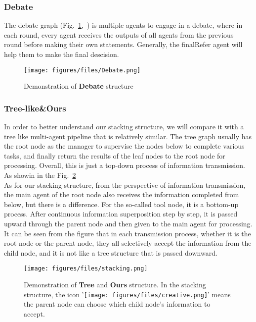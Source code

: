 \subsubsection{Debate}
The debate graph (Fig.~\ref{fig:Debate},~\cite{du2023improvingfactualityreasoninglanguage}) is multiple agents to engage in a debate, where in each round, every agent receives the outputs of all agents from the previous round before making their own statements. Generally, the finalRefer agent will help them to make the final descision.
\begin{figure}[!h] 
    \centering
    \texttt{[image: figures/files/Debate.png]}
    \caption{
    Demonstration of \textbf{Debate} structure}
    \label{fig:Debate}
\end{figure}

\subsubsection{Tree-like\&Ours}
In order to better understand our stacking structure, we will compare it with a tree like multi-agent pipeline that is relatively similar. The tree graph usually has the root node as the manager to supervise the nodes below to complete various tasks, and finally return the results of the leaf nodes to the root node for processing. Overall, this is just a top-down process of information transmission. As showin in the Fig.~\ref{fig:Stacking}\\
As for our stacking structure, from the perspective of information transmission, the main agent of the root node also receives the information completed from below, but there is a difference. For the so-called tool node, it is a bottom-up process. After continuous information superposition step by step, it is passed upward through the parent node and then given to the main agent for processing. It can be seen from the figure that in each transmission process, whether it is the root node or the parent node, they all selectively accept the information from the child node, and it is not like a tree structure that is passed downward.

\begin{figure}[!h] 
    \centering
    \texttt{[image: figures/files/stacking.png]}
    \caption{
    Demonstration of \textbf{Tree} and \textbf{Ours} structure. In the stacking structure, the icon '\texttt{[image: figures/files/creative.png]}' means the parent node can choose which child node's information to accept.}
    \label{fig:Stacking}
\end{figure}
